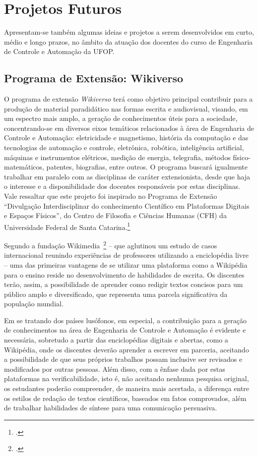\documentclass[
	12pt,				%
	openright,			%
	oneside,			%
	a4paper,			%
	english,			%
	brazil				%
	]{abntex2}
\begin{document}
\section{Projetos Futuros}
Apresentam-se também algumas ideias e projetos a serem desenvolvidos em curto, médio e longo prazos, no âmbito da atuação dos docentes do curso de Engenharia de Controle e Automação da UFOP.
%
\subsection*{Programa de Extensão: Wikiverso}
O programa de extensão \textit{Wikiverso} terá como objetivo principal contribuir para a produção de material paradidático nas formas escrita e audiovisual, visando, em um espectro mais amplo, a geração de conhecimentos úteis para a sociedade, concentrando-se em diversos eixos temáticos relacionados à área de Engenharia de Controle e Automação: eletricidade e magnetismo, história da computação e das tecnologias de automação e controle, eletrônica, robótica, inteligência artificial, máquinas e instrumentos elétricos, medição de energia, telegrafia, métodos físico-matemáticos, patentes, biografias, entre outros. O programa buscará igualmente trabalhar em paralelo com as disciplinas de caráter extensionista, desde que haja o interesse e a disponibilidade dos docentes responsáveis por estas disciplinas. Vale ressaltar que este projeto foi inspirado no Programa de Extensão ``Divulgação Interdisciplinar do conhecimento Científico em Plataformas Digitais e Espaços Físicos'', do Centro de Filosofia e Ciências Humanas (CFH) da Universidade Federal de Santa Catarina.\footcite[O projeto é atualmente coordenado pela profa. Dra. Flávia Varella, que gentilmente cedeu o original do projeto de extensão citado, do qual parte deste texto foi retirado. Ver em][]{varellaetal2022}

Segundo a fundação Wikimedia~\footcite{wikimedianasala} -- que aglutinou um estudo de casos internacional reunindo experiências de professores utilizando a enciclopédia livre -- uma das primeiras vantagens de se utilizar uma plataforma como a Wikipédia para o ensino reside no desenvolvimento de habilidades de escrita. Os discentes terão, assim, a possibilidade de aprender como redigir textos concisos para um público amplo e diversificado, que representa uma parcela significativa da população mundial.

Em se tratando dos países lusófonos, em especial, a contribuição para a geração de conhecimentos na área de Engenharia de Controle e Automação é evidente e necessária, sobretudo a partir das enciclopédias digitais e abertas, como a Wikipédia, onde os discentes deverão aprender a escrever em parceria, aceitando a possibilidade de que seus próprios trabalhos possam inclusive ser revisados e modificados por outras pessoas. Além disso, com a ênfase dada por estas plataformas na verificabilidade, isto é, não aceitando nenhuma pesquisa original, os estudantes poderão compreender, de maneira mais acertada, a diferença entre os estilos de redação de textos científicos, baseados em fatos comprovados, além de trabalhar habilidades de síntese para uma comunicação persuasiva.
\end{document}
